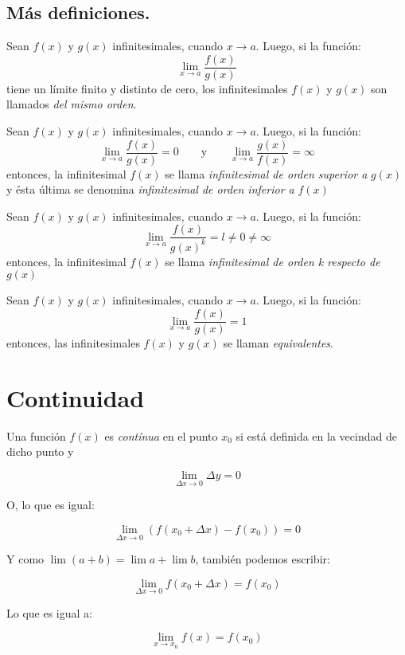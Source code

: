\documentclass[14pt,a4paper]{extarticle}
\begin{document}
\vspace{.5cm}

\subsection{M\'as definiciones.}
\begin{mydef}
Sean $f(x)$ y $g(x)$ infinitesimales, cuando $x \to a$. Luego, si la
funci\'on:
\[\lim_{x \to a}\frac{f(x)}{g(x)}\]
tiene un l\'imite finito y distinto de cero, los infinitesimales
$f(x)$ y $g(x)$ son llamados \emph{del mismo orden}.
\end{mydef}
\begin{mydef}
Sean $f(x)$ y $g(x)$ infinitesimales, cuando $x \to a$. Luego, si la
funci\'on:
\[\lim_{x \to a}\frac{f(x)}{g(x)}=0\qquad\text{y}\qquad\lim_{x \to a}\frac{g(x)}{f(x)}=\infty\]
entonces, la infinitesimal $f(x)$ se llama \emph{infinitesimal de
  orden superior a} $g(x)$ y \'esta \'ultima se denomina
\emph{infinitesimal de orden inferior a} $f(x)$
\end{mydef}

\begin{mydef}
Sean $f(x)$ y $g(x)$ infinitesimales, cuando $x \to a$. Luego, si la
funci\'on:
\[\lim_{x \to a}\frac{f(x)}{g(x)^k}=l\neq0\neq\infty\]
entonces, la infinitesimal $f(x)$ se llama \emph{infinitesimal de
  orden k respecto de} $g(x)$
\end{mydef}


\begin{mydef}
Sean $f(x)$ y $g(x)$ infinitesimales, cuando $x \to a$. Luego, si la
funci\'on:
\[\lim_{x \to a}\frac{f(x)}{g(x)}=1\]
entonces, las infinitesimales $f(x)$ y $g(x)$ se llaman
\emph{equivalentes}.
\end{mydef}

\section{Continuidad}

\begin{mydef}

Una funci\'on \( f(x) \) es \emph{cont\'inua} en el punto \( x_0 \) si
est\'a definida en la vecindad de dicho punto y

\[ \lim_{\Delta x \to 0} \Delta y = 0 \]

O, lo que es igual:


\[ \lim_{\Delta x \to 0} (f(x_0+\Delta x)-f(x_0)) = 0 \]

Y como \( \lim(a+b) = \lim a + \lim b \), tambi\'en podemos escribir:

\[ \lim_{\Delta x \to 0} f(x_0+ \Delta x) = f(x_0) \]

Lo que es igual a:

\[ \lim_{x \to x_0} f(x) = f(x_0) \]



\end{mydef}
\end{document}
